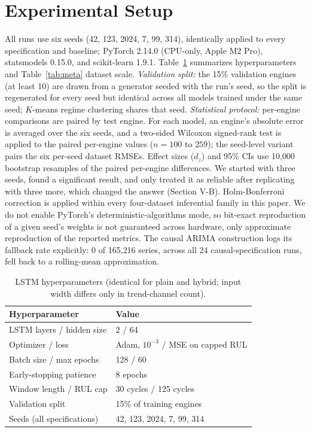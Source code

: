 \documentclass[conference]{IEEEtran}
\begin{document}
\section{Experimental Setup}
All runs use six seeds (42, 123, 2024, 7, 99, 314), identically applied to every specification and baseline; PyTorch 2.14.0 (CPU-only, Apple M2 Pro), statsmodels 0.15.0, and scikit-learn 1.9.1. Table~\ref{tab:hyperparams} summarizes hyperparameters and Table~\ref{tab:meta} dataset scale. \emph{Validation split:} the 15\% validation engines (at least 10) are drawn from a generator seeded with the run's seed, so the split is regenerated for every seed but identical across all models trained under the same seed; $K$-means regime clustering shares that seed. \emph{Statistical protocol:} per-engine comparisons are paired by test engine. For each model, an engine's absolute error is averaged over the six seeds, and a two-sided Wilcoxon signed-rank test is applied to the paired per-engine values ($n=100$ to $259$); the seed-level variant pairs the six per-seed dataset RMSEs. Effect sizes ($d_z$) and 95\% CIs use 10{,}000 bootstrap resamples of the paired per-engine differences. We started with three seeds, found a significant result, and only treated it as reliable after replicating with three more, which changed the answer (Section V-B). Holm-Bonferroni correction is applied within every four-dataset inferential family in this paper. We do not enable PyTorch's deterministic-algorithms mode, so bit-exact reproduction of a given seed's weights is not guaranteed across hardware, only approximate reproduction of the reported metrics. The causal ARIMA construction logs its fallback rate explicitly: 0 of 165{,}216 series, across all 24 causal-specification runs, fell back to a rolling-mean approximation.

\begin{table}[t]
\centering
\caption{LSTM hyperparameters (identical for plain and hybrid; input width differs only in trend-channel count).}
\label{tab:hyperparams}
\footnotesize
\begin{tabular}{ll}
\toprule
Hyperparameter & Value \\
\midrule
LSTM layers / hidden size & 2 / 64 \\
Optimizer / loss & Adam, $10^{-3}$ / MSE on capped RUL \\
Batch size / max epochs & 128 / 60 \\
Early-stopping patience & 8 epochs \\
Window length / RUL cap & 30 cycles / 125 cycles \\
Validation split & 15\% of training engines \\
Seeds (all specifications) & 42, 123, 2024, 7, 99, 314 \\
\bottomrule
\end{tabular}
\end{table}
\end{document}
